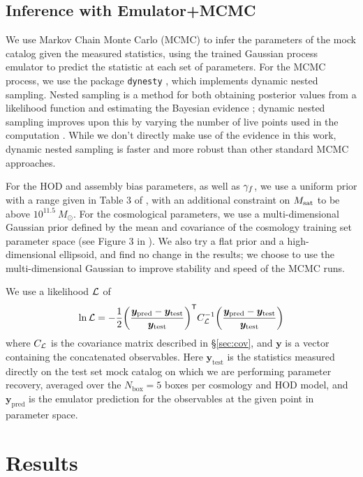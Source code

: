 \subsection{Inference with Emulator+MCMC}
\label{sec:inference}

We use Markov Chain Monte Carlo (MCMC) to infer the parameters of the mock catalog given the measured statistics, using the trained Gaussian process emulator to predict the statistic at each set of parameters.
For the MCMC process, we use the package \texttt{dynesty} \citep{Speagle2020}, which implements dynamic nested sampling.
Nested sampling is a method for both obtaining posterior values from a likelihood function and estimating the Bayesian evidence \citep{Skilling2006}; dynamic nested sampling improves upon this by varying the number of live points used in the computation \citep{Higson2019}.
While we don't directly make use of the evidence in this work, dynamic nested sampling is faster and more robust than other standard MCMC approaches.

For the HOD and assembly bias parameters, as well as $\gamma_f$, we use a uniform prior with a range given in Table 3 of \cite{Zhai2022}, with an additional constraint on $M_\mathrm{sat}$ to be above $10^{11.5} \: M_\odot$.
For the cosmological parameters, we use a multi-dimensional Gaussian prior defined by the mean and covariance of the cosmology training set parameter space (see Figure 3 in \cite{DeRose2018}).
We also try a flat prior and a high-dimensional ellipsoid, and find no change in the results; we choose to use the multi-dimensional Gaussian to improve stability and speed of the MCMC runs.

We use a likelihood $\mathcal{L}$ of
\begin{equation}
    \mathrm{ln} \, \mathcal{L} = -\frac{1}{2} \bigg( \frac{\bm{y}_\mathrm{pred} - \bm{y}_\mathrm{test}}{\bm{y}_\mathrm{test}} \bigg)^{\mathsf{T}} C_{\mathcal{L}}^{-1} \bigg( \frac{\bm{y}_\mathrm{pred} - \bm{y}_\mathrm{test}}{\bm{y}_\mathrm{test}} \bigg)
\end{equation}
where $C_{\mathcal{L}}$ is the covariance matrix described in \S\ref{sec:cov}, and $\bm{y}$ is a vector containing the concatenated observables.
Here $\bm{y}_\mathrm{test}$ is the statistics measured directly on the test set mock catalog on which we are performing parameter recovery, averaged over the $N_\mathrm{box} = 5$ boxes per cosmology and HOD model, and $\bm{y}_\mathrm{pred}$ is the emulator prediction for the observables at the given point in parameter space. 


\section{Results}
\label{sec:results_aemulus}

